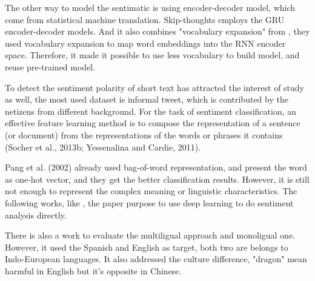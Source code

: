 The other way to model the sentimatic is using encoder-decoder model, which come from statistical machine translation. Skip-thoughts\cite{kiros2015skip} employs the GRU encoder-decoder models.
And it also combines "vocabulary expansion" from \cite{MikolovLS13}, they used vocabulary expansion to map word embeddings into the RNN encoder space.
Therefore, it made it possible to use less vocabulary to build model, and reuse pre-trained model.

To detect the sentiment polarity of short text has attracted the interest of study as well, the most used dataset is informal tweet, which is contributed by the netizens from different background. 
For the task of sentiment classification, an effective feature learning method is to compose the representation of a
sentence (or document) from the representations of the words or phrases it contains (Socher et al., 2013b; Yessenalina and Cardie, 2011).

Pang et al. (2002)\cite{pang2002thumbs} already used bag-of-word representation, and present the word as one-hot vector, and they get the better classification results. However, it is still not enough to represent the complex meaning or linguistic characteristics.
The following works, like \cite{tang2014learning}, the paper purpose to use deep learning to do sentiment analysis directly.

There is also a work\cite{multilingual} to evaluate the multiligual approach and monoligual one. However, it used the Spanish and English as target, both two are belongs 
to Indo-European languages. It also addressed the culture difference, "dragon" mean harmful in English but it's opposite in Chinese. 
